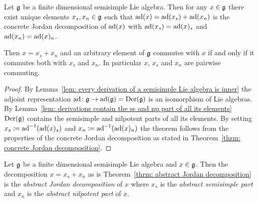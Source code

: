 \begin{thrm} \label{thrm: abstract Jordan decomposition}
 Let $\mathfrak{g}$ be a finite dimensional semisimple Lie algebra. Then for any $x \in \mathfrak{g}$ there exist unique elements $x_s, x_n \in \mathfrak{g}$ such that $\operatorname{ad}(x) = \operatorname{ad}(x_s) + \operatorname{ad}(x_n)$ is the concrete Jordan decomposition of $\operatorname{ad}(x)$ with $\operatorname{ad}(x_s) = \operatorname{ad}(x)_s$ and $\operatorname{ad}(x_n) = \operatorname{ad}(x)_n$.
 
 Then $x = x_s + x_n$ and an arbitrary element of $\mathfrak{g}$ commutes with $x$ if and only if it commutes both with $x_s$ and $x_n$. In particular $x$, $x_s$ and $x_n$ are pairwise commuting.
\end{thrm}
\begin{proof}
 By Lemma~\ref{lem: every derivation of a semisimple Lie algebra is inner} the adjoint representation $\operatorname{ad} \colon \mathfrak{g} \to \operatorname{ad}(\mathfrak{g}) = \operatorname{Der}(\mathfrak{g})$ is an isomorphism of Lie algebras. By Lemma~\ref{lem: derivations contain the ss and np part of all its elements} $\operatorname{Der}(\mathfrak{g})$ contains the semisimple and nilpotent parts of all its elements. By setting $x_s \coloneq \operatorname{ad}^{-1}(\operatorname{ad}(x)_s)$ and $x_n \coloneqq \operatorname{ad}^{-1}(\operatorname{ad}(x)_n)$ the theorem follows from the properties of the concrete Jordan decomposition as stated in Theorem~\ref{thrm: concrete Jordan decomposition}.
\end{proof}


\begin{defi}
 Let $\mathfrak{g}$ be a finite dimensional semisimple Lie algebra and $x \in \mathfrak{g}$. Then the decomposition $x = x_s + x_n$ as is Theorem~\ref{thrm: abstract Jordan decomposition} is the \emph{abstract Jordan decomposition} of $x$ where $x_s$ is the \emph{abstract semisimple part} and $x_n$ is the \emph{abstract nilpotent part} of $x$.
\end{defi}















